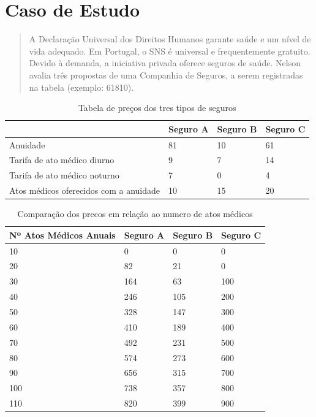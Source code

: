\documentclass[10pt,a4paper]{article}
\begin{document}
\section{Caso de Estudo}
\begin{quote}
A Declaração Universal dos Direitos Humanos garante saúde e um nível de vida adequado. Em Portugal, o SNS é universal e frequentemente gratuito. Devido à demanda, a iniciativa privada oferece seguros de saúde. Nelson avalia três propostas de uma Companhia de Seguros, a serem registradas na tabela (exemplo: 61810).
\end{quote}

\begin{table}[!ht]
    \centering
    \begin{tabular}{|l|l|l|l|}
    \hline
        ~ & Seguro A & Seguro B & Seguro C \\ \hline
        Anuidade & 81 & 10 & 61 \\ \hline
        Tarifa de ato médico diurno & 9 & 7 & 14\\ \hline
        Tarifa de ato médico noturno & 7 & 0 & 4  \\ \hline
        Atos médicos oferecidos com a anuidade & 10 & 15 & 20 \\ \hline

    \end{tabular}
	\caption{Tabela de preços dos tres tipos de seguros}
	
\end{table}


\begin{table}[!ht]
    \centering
    \begin{tabular}{|l|l|l|l|}
    \hline
        Nº Atos Médicos Anuais & Seguro A & Seguro B & Seguro C \\ \hline
        10 & 0 & 0 & 0 \\ \hline
        20 & 82 & 21 & 0 \\ \hline
        30 & 164 & 63 & 100 \\ \hline
        40 & 246 & 105 & 200 \\ \hline
        50 & 328 & 147 & 300 \\ \hline
        60 & 410 & 189 & 400 \\ \hline
        70 & 492 & 231 & 500  \\ \hline
        80 & 574 & 273 & 600  \\ \hline
        90 & 656 & 315 & 700  \\ \hline
        100 & 738 & 357 & 800  \\ \hline
        110 & 820 & 399 & 900 \\ \hline
    \end{tabular}
	\caption{Comparação dos precos em relação ao numero de atos médicos}
     \label{compare}
\end{table}
\end{document}
